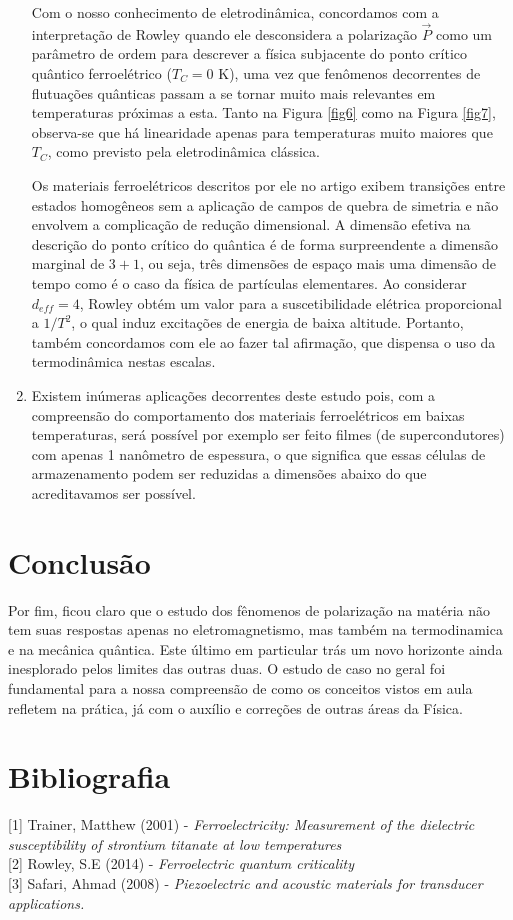 \documentclass[a4paper,12pt]{article}
\begin{document}
\begin{enumerate}
Com o nosso conhecimento de eletrodinâmica, concordamos com a interpretação de Rowley quando ele desconsidera a polarização $\vec{P}$ como um parâmetro de ordem para descrever a física subjacente do ponto crítico quântico ferroelétrico ($T_C = 0$ K), uma vez que fenômenos decorrentes de flutuações quânticas passam a se tornar muito mais relevantes em temperaturas próximas a esta. Tanto na Figura \ref{fig6} como na Figura \ref{fig7}, observa-se que há linearidade apenas para temperaturas muito maiores que $T_C$, como previsto pela eletrodinâmica clássica.

Os materiais ferroelétricos descritos por ele no artigo exibem transições entre estados homogêneos sem a aplicação de campos de quebra de simetria e não envolvem a complicação de redução dimensional. A dimensão efetiva na descrição do ponto crítico do quântica é de forma surpreendente a dimensão marginal de $3+1$, ou seja, três dimensões de espaço mais uma dimensão de tempo como é o caso da física de partículas elementares. Ao considerar $d_{eff} = 4$, Rowley obtém um valor para a suscetibilidade elétrica proporcional a $1/T^2$, o qual induz excitações de energia de baixa altitude. Portanto, também concordamos com ele ao fazer tal afirmação, que dispensa o uso da termodinâmica nestas escalas.

\item Existem inúmeras aplicações decorrentes deste estudo pois, com a compreensão do comportamento dos materiais ferroelétricos em baixas temperaturas, será possível por exemplo ser feito filmes (de supercondutores) com apenas 1 nanômetro de espessura, o que significa que essas células de armazenamento podem ser reduzidas a dimensões abaixo do que acreditavamos ser possível.

\end{enumerate}
\section{Conclusão}
Por fim, ficou claro que o estudo dos fênomenos de polarização na matéria não tem suas respostas apenas no eletromagnetismo, mas também na termodinamica e na mecânica quântica. Este último em particular trás um novo horizonte ainda inesplorado pelos limites das outras duas. O estudo de caso no geral foi fundamental para a nossa compreensão de como os conceitos vistos em aula refletem na prática, já com o auxílio e correções de outras áreas da Física.

\section{Bibliografia}
[1] Trainer, Matthew (2001) - \textit{Ferroelectricity: Measurement of the dielectric susceptibility
of strontium titanate at low temperatures} \\

[2] Rowley, S.E (2014) - \textit{Ferroelectric quantum criticality} \\

[3] Safari, Ahmad (2008) - \textit{Piezoelectric and acoustic materials for transducer applications.}
\end{document}
